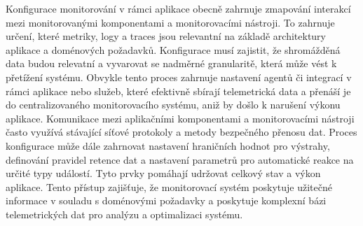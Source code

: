 Konfigurace monitorování v rámci aplikace obecně zahrnuje zmapování interakcí mezi monitorovanými komponentami a monitorovacími nástroji. To zahrnuje určení, které metriky, logy a traces jsou relevantní na základě architektury aplikace a doménových požadavků. Konfigurace musí zajistit, že shromážděná data budou relevatní a vyvarovat se nadměrné granularitě, která může vést k přetížení systému. Obvykle tento proces zahrnuje nastavení agentů či integrací v rámci aplikace nebo služeb, které efektivně sbírají telemetrická data a přenáší je do centralizovaného monitorovacího systému, aniž by došlo k narušení výkonu aplikace. Komunikace mezi aplikačními komponentami a monitorovacími nástroji často využívá stávající síťové protokoly a metody bezpečného přenosu dat. Proces konfigurace může dále zahrnovat nastavení hraničních hodnot pro výstrahy, definování pravidel retence dat a nastavení parametrů pro automatické reakce na určité typy událostí. Tyto prvky pomáhají udržovat celkový stav a výkon aplikace. Tento přístup zajišťuje, že monitorovací systém poskytuje užitečné informace v souladu s doménovými požadavky a poskytuje komplexní bázi telemetrických dat pro analýzu a optimalizaci systému. \cite{Blanco2023}
